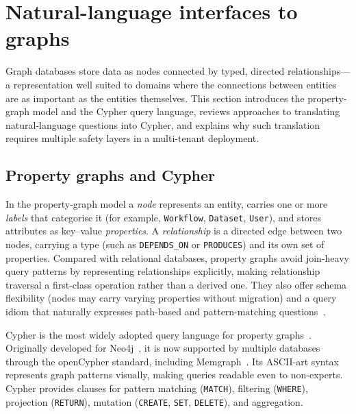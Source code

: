 \documentclass[a4paper]{sapthesis}
\begin{document}
\section{Natural-language interfaces to graphs}
\label{sec:nl-graphs}

Graph databases store data as nodes connected by typed, directed
relationships---a representation well suited to domains where the
connections between entities are as important as the entities themselves.
This section introduces the property-graph model and the Cypher query
language, reviews approaches to translating natural-language questions into
Cypher, and explains why such translation requires multiple safety layers
in a multi-tenant deployment.

\subsection{Property graphs and Cypher}

In the property-graph model a \emph{node} represents an entity, carries one
or more \emph{labels} that categorise it (for example,
\texttt{Workflow}, \texttt{Dataset}, \texttt{User}), and stores attributes as
key--value \emph{properties}.  A \emph{relationship} is a directed edge
between two nodes, carrying a type (such as \texttt{DEPENDS\_ON} or
\texttt{PRODUCES}) and its own set of properties.  Compared with
relational databases, property graphs avoid join-heavy query patterns by
representing relationships explicitly, making relationship traversal a
first-class operation rather than a derived one.  They also offer schema
flexibility (nodes may carry varying properties without migration) and a
query idiom that naturally expresses path-based and pattern-matching
questions~\cite{francis2018cypher,hogan2021knowledge}.

Cypher is the most widely adopted query language for property
graphs~\cite{opencypher2023}.  Originally developed for
Neo4j~\cite{neo4j2023}, it is now supported by multiple databases through
the openCypher standard, including Memgraph~\cite{memgraph2023}.
Its ASCII-art syntax represents graph patterns visually, making queries
readable even to non-experts.  Cypher provides clauses for pattern matching
(\texttt{MATCH}), filtering (\texttt{WHERE}), projection (\texttt{RETURN}),
mutation (\texttt{CREATE}, \texttt{SET}, \texttt{DELETE}), and aggregation.
\end{document}
